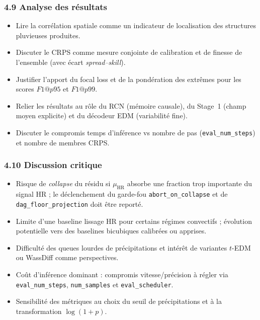\documentclass[12pt,a4paper]{article}
\begin{document}
\subsubsection*{4.9 Analyse des r\'esultats}
\begin{itemize}
    \item Lire la corr\'elation spatiale comme un indicateur de localisation des structures pluvieuses produites.
    \item Discuter le CRPS comme mesure conjointe de calibration et de finesse de l'ensemble (avec \'ecart \emph{spread--skill}).
    \item Justifier l'apport du focal loss et de la pond\'eration des extr\^emes pour les scores $F1@p95$ et $F1@p99$.
    \item Relier les r\'esultats au r\^ole du RCN (m\'emoire causale), du Stage~1 (champ moyen explicite) et du d\'ecodeur EDM (variabilit\'e fine).
    \item Discuter le compromis temps d'inf\'erence vs nombre de pas (\texttt{eval\_num\_steps}) et nombre de membres CRPS.
\end{itemize}

\subsubsection*{4.10 Discussion critique}
\begin{itemize}
    \item Risque de \emph{collapse} du r\'esidu si $\mu_{\mathrm{HR}}$ absorbe une fraction trop importante du signal HR ; le d\'eclenchement du garde-fou \texttt{abort\_on\_collapse} et de \texttt{dag\_floor\_projection} doit \^etre report\'e.
    \item Limite d'une baseline lissage HR pour certains r\'egimes convectifs ; \'evolution potentielle vers des baselines bicubiques calibr\'ees ou apprises.
    \item Difficult\'e des queues lourdes de pr\'ecipitations et int\'er\^et de variantes $t$-EDM ou WassDiff comme perspectives.
    \item Co\^ut d'inf\'erence dominant : compromis vitesse/pr\'ecision \`a r\'egler via \texttt{eval\_num\_steps}, \texttt{num\_samples} et \texttt{eval\_scheduler}.
    \item Sensibilit\'e des m\'etriques au choix du seuil de pr\'ecipitations et \`a la transformation $\log(1+p)$.
\end{itemize}
\end{document}

